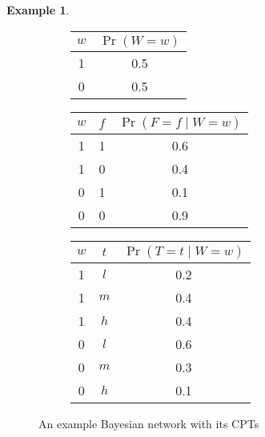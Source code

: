 \documentclass{article}
\theoremstyle{definition}
\newtheorem{example}{Example}
\theoremstyle{remark}
\begin{document}
\begin{example}
  \begin{figure}
    \centering
    \begin{subfigure}{0.2\textwidth}
      \centering
    \end{subfigure}%
    \begin{subfigure}{0.8\textwidth}
      \centering
      \begin{tabular}[t]{cc}
        \toprule
        $w$ & $\Pr(W = w)$ \\
        \midrule
        1 & 0.5 \\
        0 & 0.5 \\
        \bottomrule
      \end{tabular}
      \begin{tabular}[t]{ccc}
        \toprule
        $w$ & $f$ & $\Pr(F = f \mid W = w)$ \\
        \midrule
        1 & 1 & 0.6 \\
        1 & 0 & 0.4 \\
        0 & 1 & 0.1 \\
        0 & 0 & 0.9 \\
        \bottomrule
      \end{tabular}
      \begin{tabular}[t]{ccc}
        \toprule
        $w$ & $t$ & $\Pr(T = t \mid W = w)$ \\
        \midrule
        1 & $l$ & 0.2 \\
        1 & $m$ & 0.4 \\
        1 & $h$ & 0.4 \\
        0 & $l$ & 0.6 \\
        0 & $m$ & 0.3 \\
        0 & $h$ & 0.1 \\
        \bottomrule
      \end{tabular}
    \end{subfigure}
    \caption{An example Bayesian network with its CPTs}
    \label{fig:example_bn}
  \end{figure}


\end{example}
\end{document}
